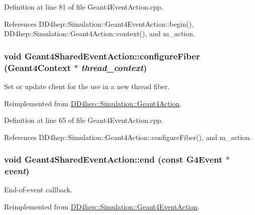 Definition at line 81 of file Geant4EventAction.cpp.

References DD4hep::Simulation::Geant4EventAction::begin(), DD4hep::Simulation::Geant4Action::context(), and m\_\-action.\hypertarget{class_d_d4hep_1_1_simulation_1_1_geant4_shared_event_action_a7933d545b7caacaca3928b3af1038df6}{
\subsubsection[{configureFiber}]{\setlength{\rightskip}{0pt plus 5cm}void Geant4SharedEventAction::configureFiber ({\bf Geant4Context} $\ast$ {\em thread\_\-context})}}
\label{class_d_d4hep_1_1_simulation_1_1_geant4_shared_event_action_a7933d545b7caacaca3928b3af1038df6}


Set or update client for the use in a new thread fiber. 

Reimplemented from \hyperlink{class_d_d4hep_1_1_simulation_1_1_geant4_action_a6adc7138508303e4e417cb48a737ab19}{DD4hep::Simulation::Geant4Action}.

Definition at line 65 of file Geant4EventAction.cpp.

References DD4hep::Simulation::Geant4Action::configureFiber(), and m\_\-action.\hypertarget{class_d_d4hep_1_1_simulation_1_1_geant4_shared_event_action_a207f1882eece3c87364b38b266bd9935}{
\subsubsection[{end}]{\setlength{\rightskip}{0pt plus 5cm}void Geant4SharedEventAction::end (const G4Event $\ast$ {\em event})}}
\label{class_d_d4hep_1_1_simulation_1_1_geant4_shared_event_action_a207f1882eece3c87364b38b266bd9935}


End-\/of-\/event callback. 

Reimplemented from \hyperlink{class_d_d4hep_1_1_simulation_1_1_geant4_event_action_af131bad73c28da3419af7c29e0b8c250}{DD4hep::Simulation::Geant4EventAction}.

